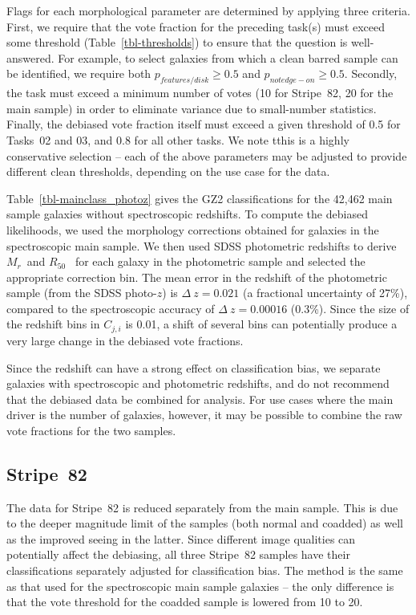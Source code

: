 \documentclass[useAMS,usenatbib]{mn2e}
\newcommand{\mr}{$M_r$}
\newcommand{\rfifty}{$R_{50}$}
\begin{document}
Flags for each morphological parameter are determined by applying three criteria. First, we require that the vote fraction for the preceding task(s) must exceed some threshold (Table~\ref{tbl-thresholds}) to ensure that the question is well-answered. For example, to select galaxies from which a clean barred sample can be identified, we require both $p_{features/disk}\geq0.5$ and $p_{not edge-on}\geq0.5$. Secondly, the task must exceed a minimum number of votes (10 for Stripe~82, 20 for the main sample) in order to eliminate variance due to small-number statistics. Finally, the debiased vote fraction itself must exceed a given threshold of 0.5 for Tasks~02 and 03, and 0.8 for all other tasks. We note tthis is a highly conservative selection -- each of the above parameters may be adjusted to provide different clean thresholds, depending on the use case for the data.%

Table~\ref{tbl-mainclass_photoz} gives the GZ2 classifications for the 42,462 main sample galaxies without spectroscopic redshifts. To compute the debiased likelihoods, we used the morphology corrections obtained for galaxies in the spectroscopic main sample. We then used SDSS photometric redshifts \citep{csa03} to derive \mr~and \rfifty~ for each galaxy in the photometric sample and selected the appropriate correction bin. The mean error in the redshift of the photometric sample (from the SDSS photo-$z$) is $\Delta~z=0.021$ (a fractional uncertainty of 27\%), compared to the spectroscopic accuracy of $\Delta~z=0.00016$ (0.3\%). Since the size of the redshift bins in $C_{j,i}$ is 0.01, a shift of several bins can potentially produce a very large change in the debiased vote fractions. 

Since the redshift can have a strong effect on classification bias, we separate galaxies with spectroscopic and photometric redshifts, and do not recommend that the debiased data be combined for analysis. For use cases where the main driver is the number of galaxies, however, it may be possible to combine the raw vote fractions for the two samples.

\subsection{Stripe~82}\label{ssec-s82}

The data for Stripe~82 is reduced separately from the main sample. This is due to the deeper magnitude limit of the samples (both normal and coadded) as well as the improved seeing in the latter. Since different image qualities can potentially affect the debiasing, all three Stripe~82 samples have their classifications separately adjusted for classification bias. The method is the same as that used for the spectroscopic main sample galaxies -- the only difference is that the vote threshold for the coadded sample is lowered from 10 to 20. 
\end{document}
